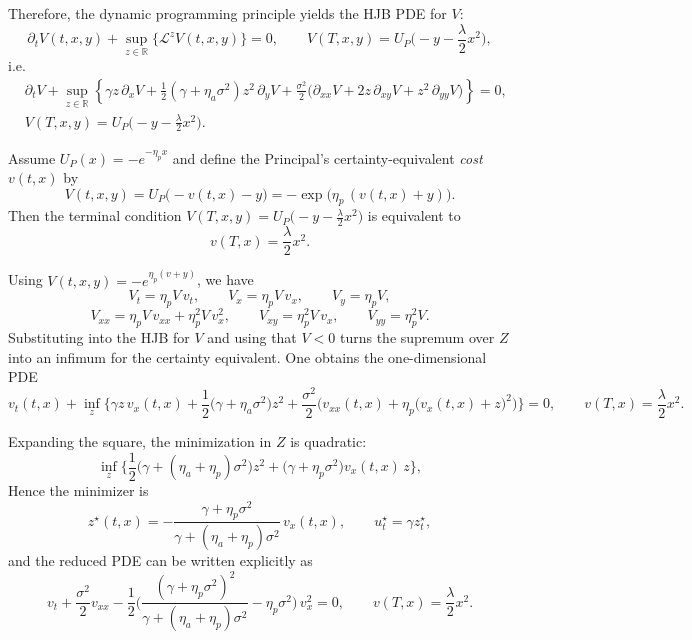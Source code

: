 \documentclass[a4paper,10pt]{article}
\theoremstyle{definition}
\theoremstyle{plain}
\numberwithin{equation}{section}
\newcommand{\hs}{\vspace{3mm}}
\begin{document}
Therefore, the dynamic programming principle yields the HJB PDE for $V$:
\[
\partial_t V(t,x,y)
+
\sup_{z\in\mathbb R}
\Big\{
\mathcal L^{z}V(t,x,y)
\Big\}
=0,
\qquad
V(T,x,y)=U_P\Big(-y-\frac{\lambda}{2}x^2\Big),
\]
i.e.
\begin{align*}
&\partial_t V
+
\sup_{z\in\mathbb R}
\left\{
\gamma z\,\partial_x V
+\frac12(\gamma+\eta_a\sigma^2)z^2\,\partial_y V
+\frac{\sigma^2}{2}\Big(
\partial_{xx}V+2z\,\partial_{xy}V+z^2\,\partial_{yy}V
\Big)
\right\}
=0,
\\
&V(T,x,y)=U_P\Big(-y-\frac{\lambda}{2}x^2\Big).
\end{align*}

\hs
Assume $U_P(x)=-e^{-\eta_p x}$ and define the Principal's certainty-equivalent \emph{cost} $v(t,x)$ by
\[
V(t,x,y)=U_P\big(-v(t,x)-y\big)=-\exp\big(\eta_p\,(v(t,x)+y)\big).
\]
Then the terminal condition $V(T,x,y)=U_P\Big(-y-\frac{\lambda}{2}x^2\Big)$ is equivalent to
\[
v(T,x)=\frac{\lambda}{2}x^2.
\]

Using $V(t,x,y)=-e^{\eta_p(v+y)}$, we have
\[
V_t=\eta_p V\,v_t,\qquad
V_x=\eta_p V\,v_x,\qquad
V_y=\eta_p V,
\]
\[
V_{xx}=\eta_p V\,v_{xx}+\eta_p^2 V\,v_x^2,\qquad
V_{xy}=\eta_p^2 V\,v_x,\qquad
V_{yy}=\eta_p^2 V.
\]
Substituting into the HJB for $V$ and using that $V<0$ turns the supremum over $Z$ into an infimum
for the certainty equivalent. One obtains the one-dimensional PDE
\[
v_t(t,x)+\inf_{z}\Big\{
\gamma z\,v_x(t,x)
+\frac12\big(\gamma+\eta_a\sigma^2\big)z^2
+\frac{\sigma^2}{2}\Big(v_{xx}(t,x)+\eta_p\big(v_x(t,x)+z\big)^2\Big)
\Big\}=0,
\qquad
v(T,x)=\frac{\lambda}{2}x^2.
\]

Expanding the square, the minimization in $Z$ is quadratic:
\[
\inf_{z}\big\{
\frac12\big(\gamma+(\eta_a+\eta_p)\sigma^2\big)z^2
+\big(\gamma+\eta_p\sigma^2\big)v_x(t,x)\,z
\big\},
\]
 Hence the minimizer is
\[
z^\star(t,x)
=
-\frac{\gamma+\eta_p\sigma^2}{\gamma+(\eta_a+\eta_p)\sigma^2}\,v_x(t,x),
\qquad
u_t^\star=\gamma z_t^\star,
\]
and the reduced PDE can be written explicitly as
\[
v_t+\frac{\sigma^2}{2}v_{xx}
-\frac12\Big(\frac{(\gamma+\eta_p\sigma^2)^2}{\gamma+(\eta_a+\eta_p)\sigma^2 } -  \eta_p\sigma^2 \Big)  
\,v_x^2
=0,
\qquad
v(T,x)=\frac{\lambda}{2}x^2.
\]
\end{document}
